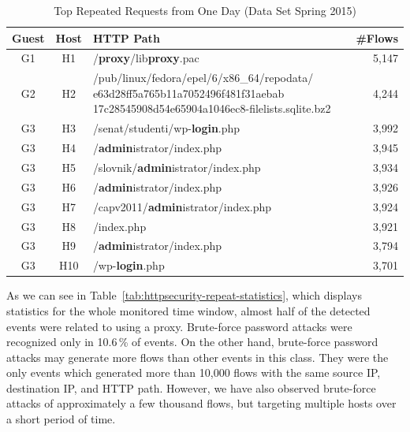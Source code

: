 \begin{table}[ht]
\centering
\begin{tabular}{| c | c | l | r|} \hline
Guest & Host & HTTP Path & \#Flows \\ \hline
G1  & H1 & /\textbf{proxy}/lib\textbf{proxy}.pac & 5,147 \\ \hline
G2  & H2 & \parbox[t]{5cm}{/pub/linux/fedora/epel/6/x86\_64/repodata/ e63d28ff5a765b11a7052496f481f31aebab\\17c28545908d54e65904a1046ec8-filelists.sqlite.bz2} & 4,244 \\ \hline
G3  & H3 & /senat/studenti/wp-\textbf{login}.php & 3,992 \\ \hline
G3  & H4 & /\textbf{admin}istrator/index.php & 3,945 \\ \hline
G3  & H5 & /slovnik/\textbf{admin}istrator/index.php & 3,934 \\ \hline
G3  & H6 & /\textbf{admin}istrator/index.php & 3,926 \\ \hline
G3  & H7 & /capv2011/\textbf{admin}istrator/index.php & 3,924 \\ \hline
G3  & H8 & /index.php & 3,921 \\ \hline
G3  & H9 & /\textbf{admin}istrator/index.php & 3,794 \\ \hline
G3  & H10 & /wp-\textbf{login}.php & 3,701 \\ \hline
\end{tabular}
\caption{Top Repeated Requests from One Day (Data Set Spring 2015)}
\label{tab:httpsecurity-repeat2}
\end{table}

As we can see in Table~\ref{tab:httpsecurity-repeat-statistics}, which displays statistics for the whole monitored time window, almost half of the detected events were related to using a proxy. Brute-force password attacks were recognized only in 10.6\,\% of events. On the other hand, brute-force password attacks may generate more flows than other events in this class. They were the only events which generated more than 10,000 flows with the same source IP, destination IP, and HTTP path. However, we have also observed brute-force attacks of approximately a few thousand flows, but targeting multiple hosts over a short period of time.

